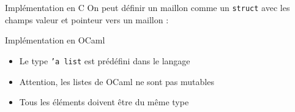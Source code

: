 \documentclass[10pt]{beamer}
\begin{document}
\begin{frame}[fragile]{\Ctitle}{\stitle}
	\begin{block}{Implémentation en C}
		On peut définir un maillon comme un {\tt struct} avec les champs valeur et pointeur vers un maillon :
	\end{block}
	\begin{block}{Implémentation en OCaml}
		\begin{itemize}
			\item Le type {\tt 'a list} est prédéfini dans le langage
			\item Attention, les listes de OCaml ne sont pas mutables
			\item Tous les éléments doivent être du même type
		\end{itemize}
	\end{block}
\end{frame}
\end{document}
